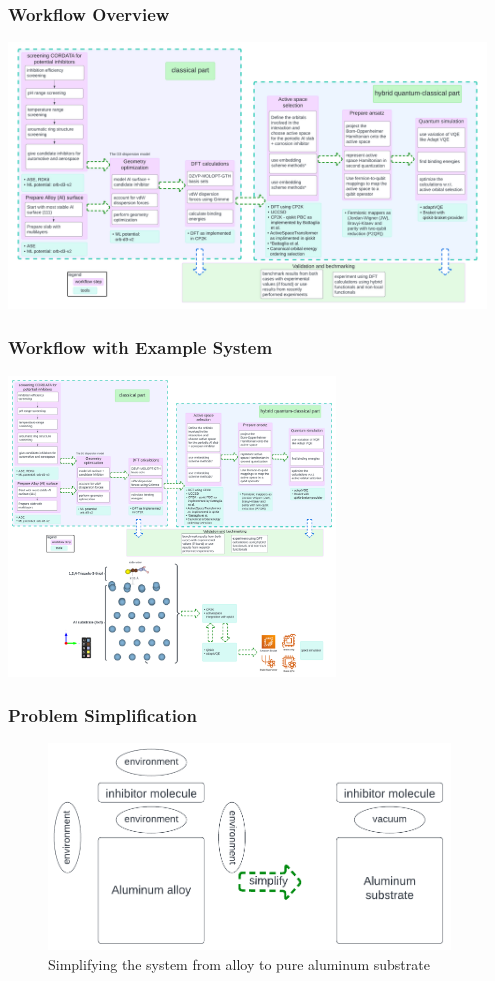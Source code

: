 \begin{frame}
\frametitle{Workflow Overview}
\centering
\includegraphics[width=0.95\textwidth]{../../../content/img/matsci_qc_simple_hybrid_wf.png}
\end{frame}

\begin{frame}
\frametitle{Workflow with Example System}
\centering
\includegraphics[width=0.65\textwidth]{../../../content/img/matsci_qc_simple_hybrid_wf_with_example.png}
\end{frame}

\begin{frame}
\frametitle{Problem Simplification}
\begin{figure}
\centering
\includegraphics[width=0.95\textwidth]{../../../content/img/matsci_qc_simplify_problem.png}
\caption{Simplifying the system from alloy to pure aluminum substrate}
\end{figure}
\end{frame}

